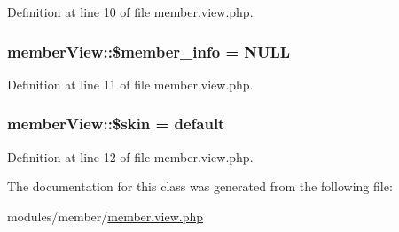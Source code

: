 Definition at line 10 of file member.\+view.\+php.

\hypertarget{classmemberView_a435c30d8223b51ac6b6a568142dc6c2e}{}
\subsubsection[{\$member\+\_\+info}]{\setlength{\rightskip}{0pt plus 5cm}member\+View\+::\$member\+\_\+info = N\+U\+L\+L}\label{classmemberView_a435c30d8223b51ac6b6a568142dc6c2e}


Definition at line 11 of file member.\+view.\+php.

\hypertarget{classmemberView_a01171d2b82e91a06754a9f8c52af6962}{}
\subsubsection[{\$skin}]{\setlength{\rightskip}{0pt plus 5cm}member\+View\+::\$skin = \textquotesingle{}default\textquotesingle{}}\label{classmemberView_a01171d2b82e91a06754a9f8c52af6962}


Definition at line 12 of file member.\+view.\+php.



The documentation for this class was generated from the following file\+:\begin{DoxyCompactItemize}
\item 
modules/member/\hyperlink{member_8view_8php}{member.\+view.\+php}\end{DoxyCompactItemize}
